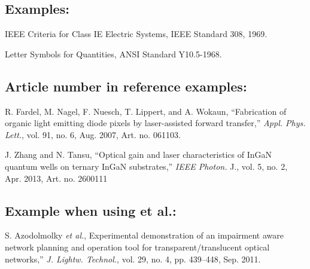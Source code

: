 \subsection*{Examples:}

\begin{thebibliography}{34}
\setcounter{enumiv}{29}


\bibitem{}IEEE Criteria for Class IE Electric Systems, IEEE Standard 308, 1969.

\bibitem{} Letter Symbols for Quantities, ANSI Standard Y10.5-1968.
\end{thebibliography}

\subsection*{Article number in reference examples:}

\begin{thebibliography}{34}
\setcounter{enumiv}{31}

\bibitem{}R. Fardel, M. Nagel, F. Nuesch, T. Lippert, and A. Wokaun, ``Fabrication of organic light emitting diode pixels by laser-assisted forward transfer,'' {\em Appl. Phys. Lett.}, vol. 91, no. 6, Aug. 2007, Art. no. 061103. 

\bibitem{} J. Zhang and N. Tansu, ``Optical gain and laser characteristics of InGaN quantum wells on ternary InGaN substrates,'' {\em IEEE Photon.} J., vol. 5, no. 2, Apr. 2013, Art. no. 2600111
\end{thebibliography}

\subsection*{Example when using et al.:}

\begin{thebibliography}{34}
\setcounter{enumiv}{33}

\bibitem{}S. Azodolmolky {\em et al.}, Experimental demonstration of an impairment aware network planning and operation tool for transparent/translucent optical networks,'' {\em J. Lightw. Technol.}, vol. 29, no. 4, pp. 439--448, Sep. 2011.
\end{thebibliography}
